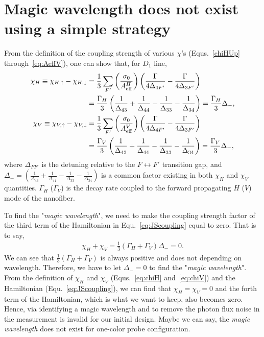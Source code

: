 \section{Magic wavelength does not exist using a simple strategy}
From the definition of the coupling strength of various $ \chi $'s (Equs.~\eqref{chiHUp} through~\eqref{eq:AeffV}), one can show that, for $ D_1 $ line, 
\begin{align}
\chi_H \equiv \chi_{H,\uparrow} - \chi_{H,\downarrow} &= \frac{1}{3}\sum_{F'} \left(\frac{\sigma_0}{A_{\rm eff}^H} \right) \left(\frac{\Gamma}{4\Delta_{4F'}} - \frac{\Gamma}{4\Delta_{3F'}} \right) \nonumber\\
&= \frac{\Gamma_H}{3} \left(\frac{1}{\Delta_{43}}+\frac{1}{\Delta_{44}} - \frac{1}{\Delta_{33}}-\frac{1}{\Delta_{34}} \right) = \frac{\Gamma_H}{3}\Delta_-,\label{eq:chiH}\\
\chi_V \equiv \chi_{V,\uparrow} - \chi_{V,\downarrow} &= \frac{1}{3}\sum_{F'} \left(\frac{\sigma_0}{A_{\rm eff}^V} \right) \left(\frac{\Gamma}{4\Delta_{4F'}} - \frac{\Gamma}{4\Delta_{3F'}} \right) \nonumber\\
&= \frac{\Gamma_V}{3} \left(\frac{1}{\Delta_{43}}+\frac{1}{\Delta_{44}} - \frac{1}{\Delta_{33}}-\frac{1}{\Delta_{34}} \right)=\frac{\Gamma_V}{3}\Delta_-,\label{eq:chiV}
\end{align}
where $ \Delta_{FF'} $ is the detuning relative to the $ F\leftrightarrow F' $ transition gap, and $ \Delta_- = \left(\frac{1}{\Delta_{43}}+\frac{1}{\Delta_{44}} - \frac{1}{\Delta_{33}}-\frac{1}{\Delta_{34}} \right) $ is a common factor existing in both $ \chi_H $ and $ \chi_V $ quantities. $ \Gamma_H $ ($ \Gamma_V $) is the decay rate coupled to the forward propagating $ H $ ($ V $) mode of the nanofiber. 

To find the "\textit{magic wavelength}", we need to make the coupling strength factor of the third term of the Hamiltonian in Equ.~\eqref{eq:JScoupling} equal to zero. That is to say,
\begin{align}
\chi_H+\chi_V=\frac{1}{3}\left(\Gamma_H + \Gamma_V \right)\Delta_- = 0.
\end{align}
We can see that $ \frac{1}{3}\left(\Gamma_H + \Gamma_V \right) $ is always positive and does not depending on wavelength. Therefore, we have to let $ \Delta_-=0 $ to find the "\textit{magic wavelength}". From the definition of $ \chi_H $ and $ \chi_V $ (Equs.~\eqref{eq:chiH} and~\eqref{eq:chiV}) and the Hamiltonian (Equ.~\eqref{eq:JScoupling}), we can find that $ \chi_H=\chi_V=0 $ and the forth term of the Hamiltonian, which is what we want to keep, also becomes zero. Hence, via identifying a magic wavelength and to remove the photon flux noise in the measurement is invalid for our initial design. Maybe we can say, the \textit{magic wavelength} does not exist for one-color probe configuration. 

